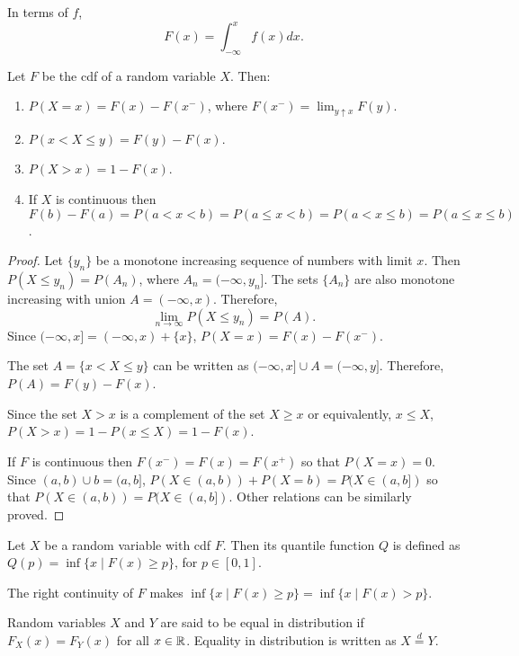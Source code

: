 \documentclass{article}
\begin{document}
In terms of $f$,
\[
F(x) = \int_{-\infty}^x f(x)dx.
\]

\begin{prop}\label{c2p2}
Let $F$ be the cdf of a random variable $X$. Then:
\begin{enumerate}
\item $P(X=x) = F(x) - F(x^-)$, where $F(x^-) = \lim_{y \uparrow x}F(y)$.
\item $P(x < X \le y) = F(y) - F(x)$.
\item $P(X > x) = 1 - F(x)$.
\item If $X$ is continuous then $F(b) - F(a) = P(a < x < b) = P(a \le x < b) =
P(a < x \le b) = P(a \le x \le b)$.
\end{enumerate}
\end{prop}
\begin{proof}
Let $\{y_n\}$ be a monotone increasing sequence of numbers with limit $x$. Then
$P(X \le y_n) = P(A_n)$, where $A_n = (-\infty, y_n]$. The sets $\{A_n\}$ are 
also monotone increasing with union $A = (-\infty, x)$. Therefore,
\[
\lim_{n \rightarrow \infty}P(X \le y_n) = P(A).
\]
Since $(-\infty, x] = (-\infty, x) + \{x\}$, $P(X=x) = F(x) - F(x^-)$.

The set $A = \{x < X \le y\}$ can be written as $(-\infty, x] \cup A = 
(-\infty, y]$. Therefore, $P(A) = F(y) - F(x)$.

Since the set $X > x$ is a complement of the set $X \ge x$ or equivalently,
$x \le X$, $P(X > x) = 1 - P(x \le X) = 1 - F(x)$.

If $F$ is continuous then $F(x^-) = F(x) = F(x^+)$ so that $P(X=x) = 0$. Since
$(a, b) \cup {b} = (a, b]$, $P(X \in (a, b)) + P(X = b) = P(X \in (a, b])$ so 
that $P(X \in (a, b)) = P(X \in (a, b])$. Other relations can be similarly 
proved.
\end{proof}

\begin{defn}\label{c2d8}
Let $X$ be a random variable with cdf $F$. Then its quantile function $Q$ is 
defined as $Q(p) = \inf\{x \;|\; F(x) \ge p\}$, for $p \in [0, 1]$.
\end{defn}
\begin{rem}
The right continuity of $F$ makes $\inf\{x \;|\; F(x) \ge p\} = 
\inf\{x \;|\; F(x) > p\}$.
\end{rem}

\begin{defn}\label{c2d9}
Random variables $X$ and $Y$ are said to be equal in distribution if $F_X(x) = 
F_Y(x)$ for all $x \in \mathbb{R}$. Equality in distribution is written as $X
\stackrel{d}{=} Y$.
\end{defn}
\end{document}
